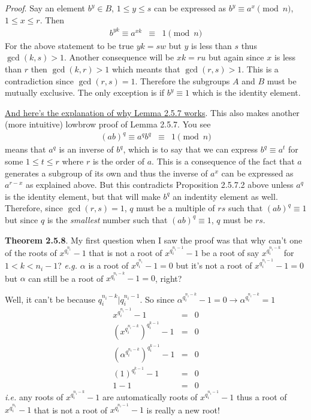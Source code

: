 \documentclass[aps,preprint,preprintnumbers,nofootinbib,showpacs,prd]{revtex4-1}
\newcommand{\ie}{{\it i.e.} }
\newcommand{\eg}{{\it e.g.} }
\newcommand{\nbea}{\begin{eqnarray*}}
\newcommand{\neea}{\end{eqnarray*}}
\begin{document}
{\it Proof}. Say an element $b^y \in B$, $1 \le y \le s$ can be expressed as $b^y \equiv a^x \pmod{n}$, $1 \le x \le r$. Then
%
\nbea
b^{yk} \equiv a^{xk} & \equiv & 1 \pmod{n}
\neea
%
For the above statement to be true $yk = sw$ but $y$ is less than $s$ thus $\gcd(k, s) > 1$. Another consequence will be $xk = ru$ but again since $x$ is less than $r$ then $\gcd(k, r) > 1$ which meants that $\gcd(r,s) > 1$. This is a contradiction since $\gcd(r,s) = 1$. Therefore the subgroups $A$ and $B$ must be mutually exclusive. The only exception is if $b^y \equiv 1$ which is the identity element.
 
\underline{And here's the explanation of why Lemma 2.5.7 works}. This also makes another (more intuitive) lowbrow proof of Lemma 2.5.7. You see
%
\nbea
(ab)^q \equiv a^q b^q & \equiv & 1 \pmod{n}
\neea
%
means that $a^q$ is an inverse of $b^q$, which is to say that we can express $b^q \equiv a^t$ for some $1 \le t \le r$ where $r$ is the order of $a$. This is a consequence of the fact that $a$ generates a subgroup of its own and thus the inverse of $a^x$ can be expressed as $a^{r-x}$ as explained above. But this contradicts Proposition 2.5.7.2 above unless $a^q$ is the identity element, but that will make $b^q$ an indentity element as well. Therefore, since $\gcd(r,s) = 1$, $q$ must be a multiple of $rs$ such that $(ab)^q \equiv 1$ but since $q$ is the {\it smallest} number such that $(ab)^q \equiv 1$, $q$ must be $rs$.

{\bf Theorem 2.5.8}. My first question when I saw the proof was that why can't one of the roots of $x^{q_i^{n_i}} - 1$ that is not a root of $x^{q_i^{n_i - 1}} - 1$ be a root of say $x^{q_i^{n_i - k}}$ for $1 < k < n_i - 1$? \eg $\alpha$ is a root of $x^{q_i^{n_i}} - 1 = 0$ but it's not a root of $x^{q_i^{n_i - 1}} - 1 = 0$ but $\alpha$ can still be a root of $x^{q_i^{n_i - k}} -1 = 0$, right?

Well, it can't be because $q_i^{n_i - k} | q_i^{n_i-1}$. So since $\alpha^{q_i^{n_i - k}} -1 = 0 \to \alpha^{q_i^{n_i - k}} = 1$
%
\nbea
x^{q_i^{n_i-1}} - 1 & = & 0 \\
\left (x^{q_i^{n_i-k}} \right )^{q_i^{k-1}} - 1 & = & 0 \\
\left (\alpha^{q_i^{n_i-k}} \right )^{q_i^{k-1}} - 1 & = & 0 \\
\left (1 \right )^{q_i^{k-1}} - 1 & = & 0 \\
1-1 & = & 0
\neea
%
\ie any roots of $x^{q_i^{n_i - k}} - 1$ are automatically roots of $x^{q_i^{n_i - 1}} - 1$ thus a root of $x^{q_i^{n_i}} - 1$ that is not a root of $x^{q_i^{n_i - 1}} - 1$ is really a new root!
\end{document}
